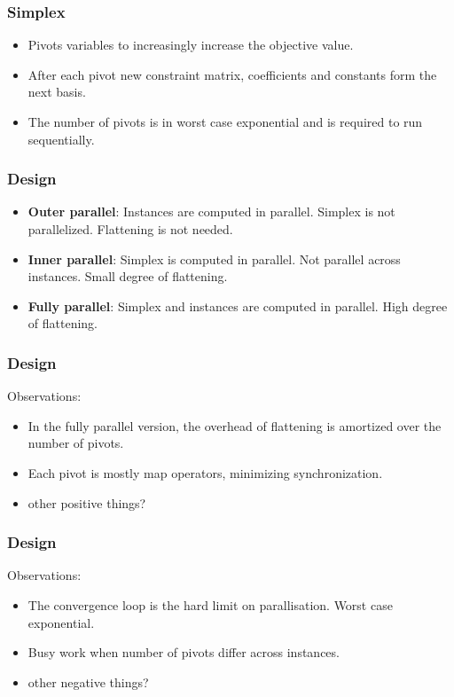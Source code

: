 \documentclass[handout]{beamer}
\begin{document}
\begin{frame}
\frametitle{Simplex}
\begin{itemize}
	\item Pivots variables to increasingly increase the objective value.
	\item After each pivot new constraint matrix, coefficients and constants form the next basis.
	\item The number of pivots is in worst case exponential and is required to run sequentially.
\end{itemize}
\end{frame}

\begin{frame}
\frametitle{Design}
\begin{itemize}
	\item \textbf{Outer parallel}: Instances are computed in parallel. Simplex is not parallelized. Flattening is not needed.
	
	\item \textbf{Inner parallel}: Simplex is computed in parallel. Not parallel across instances. Small degree of flattening.
	
	\item \textbf{Fully parallel}: Simplex and instances are computed in parallel. High degree of flattening.
\end{itemize}
\end{frame}

\begin{frame}
\frametitle{Design}
Observations:
\begin{itemize}
	\item In the fully parallel version, the overhead of flattening is amortized over the number of pivots.
	
	\item Each pivot is mostly map operators, minimizing synchronization.
	
	\item other positive things?
\end{itemize}
\end{frame}

\begin{frame}
\frametitle{Design}
Observations:
\begin{itemize}
	\item The convergence loop is the hard limit on parallisation. Worst case exponential. 
	
	\item Busy work when number of pivots differ across instances.
	
	\item other negative things?
\end{itemize}
\end{frame}
\end{document}
